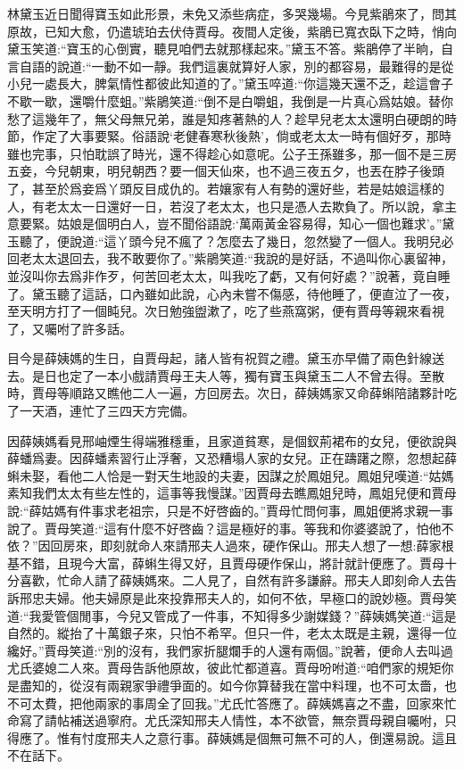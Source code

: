 \begin{parag}
    林黛玉近日聞得寶玉如此形景，未免又添些病症，多哭幾場。今見紫鵑來了，問其原故，已知大愈，仍遣琥珀去伏侍賈母。夜間人定後，紫鵑已寬衣臥下之時，悄向黛玉笑道:“寶玉的心倒實，聽見咱們去就那樣起來。”黛玉不答。紫鵑停了半晌，自言自語的說道:“一動不如一靜。我們這裏就算好人家，別的都容易，最難得的是從小兒一處長大，脾氣情性都彼此知道的了。”黛玉啐道:“你這幾天還不乏，趁這會子不歇一歇，還嚼什麼蛆。”紫鵑笑道:“倒不是白嚼蛆，我倒是一片真心爲姑娘。替你愁了這幾年了，無父母無兄弟，誰是知疼著熱的人？趁早兒老太太還明白硬朗的時節，作定了大事要緊。俗語說‘老健春寒秋後熱’，倘或老太太一時有個好歹，那時雖也完事，只怕耽誤了時光，還不得趁心如意呢。公子王孫雖多，那一個不是三房五妾，今兒朝東，明兒朝西？要一個天仙來，也不過三夜五夕，也丟在脖子後頭了，甚至於爲妾爲丫頭反目成仇的。若孃家有人有勢的還好些，若是姑娘這樣的人，有老太太一日還好一日，若沒了老太太，也只是憑人去欺負了。所以說，拿主意要緊。姑娘是個明白人，豈不聞俗語說:‘萬兩黃金容易得，知心一個也難求’。”黛玉聽了，便說道:“這丫頭今兒不瘋了？怎麼去了幾日，忽然變了一個人。我明兒必回老太太退回去，我不敢要你了。”紫鵑笑道:“我說的是好話，不過叫你心裏留神，並沒叫你去爲非作歹，何苦回老太太，叫我吃了虧，又有何好處？”說著，竟自睡了。黛玉聽了這話，口內雖如此說，心內未嘗不傷感，待他睡了，便直泣了一夜，至天明方打了一個盹兒。次日勉強盥漱了，吃了些燕窩粥，便有賈母等親來看視了，又囑咐了許多話。
\end{parag}


\begin{parag}
    目今是薛姨媽的生日，自賈母起，諸人皆有祝賀之禮。黛玉亦早備了兩色針線送去。是日也定了一本小戲請賈母王夫人等，獨有寶玉與黛玉二人不曾去得。至散時，賈母等順路又瞧他二人一遍，方回房去。次日，薛姨媽家又命薛蝌陪諸夥計吃了一天酒，連忙了三四天方完備。
\end{parag}


\begin{parag}
    因薛姨媽看見邢岫煙生得端雅穩重，且家道貧寒，是個釵荊裙布的女兒，便欲說與薛蟠爲妻。因薛蟠素習行止浮奢，又恐糟塌人家的女兒。正在躊躇之際，忽想起薛蝌未娶，看他二人恰是一對天生地設的夫妻，因謀之於鳳姐兒。鳳姐兒嘆道:“姑媽素知我們太太有些左性的，這事等我慢謀。”因賈母去瞧鳳姐兒時，鳳姐兒便和賈母說:“薛姑媽有件事求老祖宗，只是不好啓齒的。”賈母忙問何事，鳳姐便將求親一事說了。賈母笑道:“這有什麼不好啓齒？這是極好的事。等我和你婆婆說了，怕他不依？”因回房來，即刻就命人來請邢夫人過來，硬作保山。邢夫人想了一想:薛家根基不錯，且現今大富，薛蝌生得又好，且賈母硬作保山，將計就計便應了。賈母十分喜歡，忙命人請了薛姨媽來。二人見了，自然有許多謙辭。邢夫人即刻命人去告訴邢忠夫婦。他夫婦原是此來投靠邢夫人的，如何不依，早極口的說妙極。賈母笑道:“我愛管個閒事，今兒又管成了一件事，不知得多少謝媒錢？”薛姨媽笑道:“這是自然的。縱抬了十萬銀子來，只怕不希罕。但只一件，老太太既是主親，還得一位纔好。”賈母笑道:“別的沒有，我們家折腿爛手的人還有兩個。”說著，便命人去叫過尤氏婆媳二人來。賈母告訴他原故，彼此忙都道喜。賈母吩咐道:“咱們家的規矩你是盡知的，從沒有兩親家爭禮爭面的。如今你算替我在當中料理，也不可太嗇，也不可太費，把他兩家的事周全了回我。”尤氏忙答應了。薛姨媽喜之不盡，回家來忙命寫了請帖補送過寧府。尤氏深知邢夫人情性，本不欲管，無奈賈母親自囑咐，只得應了。惟有忖度邢夫人之意行事。薛姨媽是個無可無不可的人，倒還易說。這且不在話下。
\end{parag}


